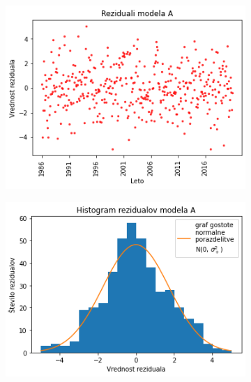 \documentclass[12pt, a4paper]{article}
\begin{document}
\begin{figure}[h]
    \begin{subfigure}{0.45\textwidth}
		\centering
		\includegraphics[width=\textwidth]{Naloga_3_06}
	\end{subfigure}
    \begin{subfigure}{0.45\textwidth}
		\centering
		\includegraphics[width=\textwidth]{Naloga_3_07}
	\end{subfigure}
\end{figure}
\end{document}
